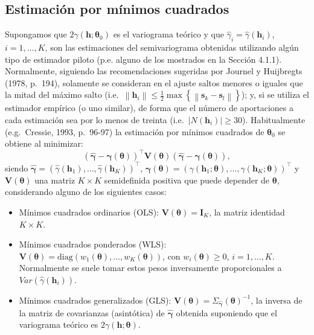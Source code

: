 \documentclass[
  spanish,
]{book}
\theoremstyle{break}
\theoremstyle{definition}
\theoremstyle{definition}
\theoremstyle{definition}
\theoremstyle{definition}
\theoremstyle{remark}
\begin{document}
\hypertarget{ls-fit}{%
\subsection{Estimación por mínimos cuadrados}\label{ls-fit}}

Supongamos que \(2\gamma(\mathbf{h};\boldsymbol{\theta}_{0})\) es el variograma teórico y que \(\hat{\gamma}_{i} =\hat{\gamma}(\mathbf{h}_{i})\), \(i = 1,\ldots,K\), son las estimaciones del semivariograma obtenidas utilizando algún tipo de estimador piloto (p.e. alguno de los mostrados en la Sección 4.1.1).
Normalmente, siguiendo las recomendaciones sugeridas por Journel y Huijbregts (1978, p.~194), solamente se consideran en el ajuste saltos menores o iguales que la mitad del máximo salto (i.e.~\(\left\| \mathbf{h}_{i} \right\| \leq \frac{1}{2} \max \left\{ \left\| \mathbf{s}_{k} -\mathbf{s}_{l} \right\| \right\}\)); y, si se utiliza el estimador empírico (o uno similar), de forma que el número de aportaciones a cada estimación sea por lo menos de treinta (i.e.~\(\left| N(\mathbf{h}_{i})\right| \geq 30\)).
Habitualmente (e.g.~Cressie, 1993, p.~96-97) la estimación por mínimos cuadrados de \(\boldsymbol{\theta}_{0}\) se obtiene al minimizar:
\begin{equation} 
  \left( \hat{\boldsymbol{\gamma}} - \boldsymbol{\gamma}(\boldsymbol{\theta})\right)^{\top } \mathbf{V}(\boldsymbol{\theta})\left( \hat{\boldsymbol{\gamma}} - \boldsymbol{\gamma}(\boldsymbol{\theta})\right),
  \label{eq:ls-obj}
\end{equation}
siendo \(\hat{\boldsymbol{\gamma}} =(\hat{\gamma}(\mathbf{h}_1),\ldots,\hat{\gamma} (\mathbf{h}_{K}))^\top\), \(\boldsymbol{\gamma}(\boldsymbol{\theta})=(\gamma(\mathbf{h}_1 ;\boldsymbol{\theta}),\ldots,\gamma(\mathbf{h}_{K} ;\boldsymbol{\theta}))^\top\)
y \(\mathbf{V}(\boldsymbol{\theta})\) una matriz \(K\times K\) semidefinida positiva que puede
depender de \(\boldsymbol{\theta}\), considerando alguno de los siguientes casos:

\begin{itemize}
\item
  Mínimos cuadrados ordinarios (OLS): \(\mathbf{V}(\boldsymbol{\theta}) = \mathbf{I}_{K}\),
  la matriz identidad \(K\times K\).
\item
  Mínimos cuadrados ponderados (WLS): \(\mathbf{V}(\boldsymbol{\theta}) = \text{diag}(w_1 (\boldsymbol{\theta}),\ldots,w_{K}(\boldsymbol{\theta}))\),
  con \(w_{i}(\boldsymbol{\theta})\geq 0\), \(i=1,\ldots,K\).
  Normalmente se suele tomar estos pesos inversamente proporcionales a \(Var(\hat{\gamma}(\mathbf{h}_{i}))\).
\item
  Mínimos cuadrados generalizados (GLS): \(\mathbf{V}(\boldsymbol{\theta})=\Sigma_{\hat{\boldsymbol{\gamma}}} (\boldsymbol{\theta})^{-1}\),
  la inversa de la matriz de covarianzas (asintótica) de \(\hat{\boldsymbol{\gamma}}\) obtenida suponiendo que el variograma teórico es \(2\gamma(\mathbf{h};\boldsymbol{\theta})\).
\end{itemize}
\end{document}
